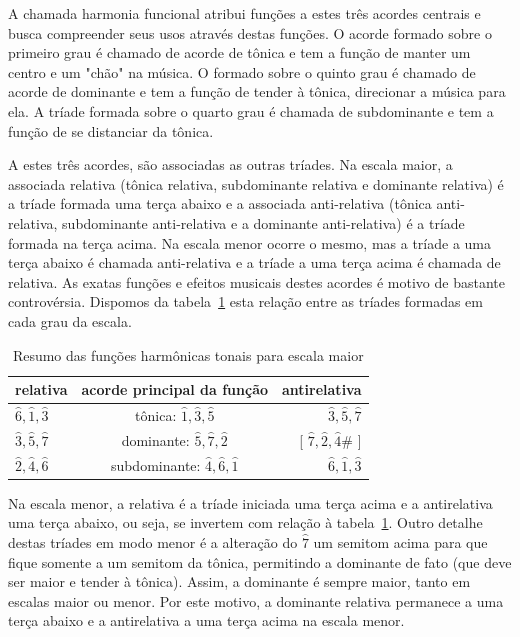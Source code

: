 A chamada harmonia funcional atribui funções a estes três acordes centrais e busca compreender seus usos através destas funções. O acorde formado sobre o primeiro grau é chamado de acorde de tônica e tem a função de manter um centro e um "chão" na música. O formado sobre o quinto grau é chamado de acorde de dominante e tem a função de tender à tônica, direcionar a música para ela. A tríade formada sobre o quarto grau é chamada de subdominante e tem a função de se distanciar da tônica.


A estes três acordes, são associadas as outras tríades. Na escala maior, a associada relativa (tônica relativa, subdominante relativa e dominante relativa) é a tríade formada uma terça abaixo e a associada anti-relativa (tônica anti-relativa, subdominante anti-relativa e a dominante anti-relativa) é a tríade formada na terça acima. Na escala menor ocorre o mesmo, mas a tríade a uma terça abaixo é chamada anti-relativa e a tríade a uma terça acima é chamada de relativa. As exatas funções e efeitos musicais destes acordes é motivo de bastante controvérsia. Dispomos da tabela~\ref{tab:harmonia} esta relação entre as tríades formadas em cada grau da escala.

\begin{table}[htpq!]
\centering
\begin{tabular}{l | c | r}
relativa & acorde principal da função & antirelativa \\\hline\hline
$\hat{6},\hat{1},\hat{3}$ & tônica:       $\hat{1},\hat{3},\hat{5}$ & $\hat{3}, \hat{5},      \hat{7}$ \\
$\hat{3},\hat{5},\hat{7}$ & dominante:    $\hat{5},\hat{7},\hat{2}$ & [ $\hat{7},\hat{2},\hat{4}\#$ ] \\
$\hat{2},\hat{4},\hat{6}$ & subdominante: $\hat{4},\hat{6},\hat{1}$ & $\hat{6},\hat{1},       \hat{3}$
\end{tabular}
\caption{Resumo das funções harmônicas tonais para escala maior}
\label{tab:harmonia}
\end{table}

Na escala menor, a relativa é a tríade iniciada uma terça acima e a antirelativa uma terça abaixo,
ou seja, se invertem com relação à tabela~\ref{tab:harmonia}. Outro detalhe destas tríades em modo
menor é a alteração do $\hat{7}$ um semitom acima para que fique somente a um semitom da tônica,
permitindo a dominante de fato (que deve ser maior e tender à tônica). Assim, a dominante é sempre maior, tanto em escalas maior ou menor. Por este motivo, a dominante relativa permanece a uma terça abaixo e a antirelativa a uma terça acima na escala menor.

